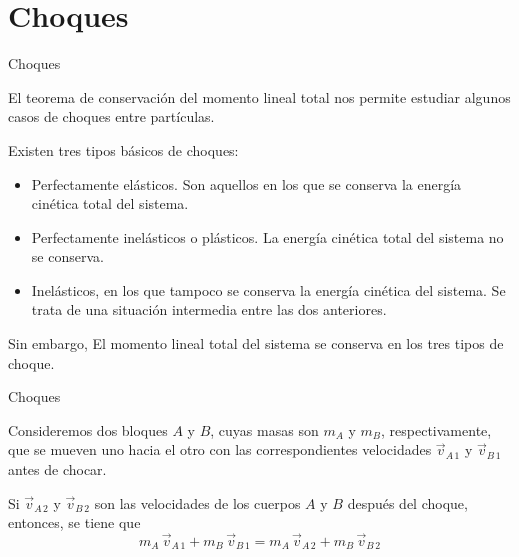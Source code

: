 \documentclass[11pt,handout,aspectratio=1610]{beamer}
\begin{document}
\section{Choques}

\begin{frame}{Choques}

    El teorema de conservación del momento lineal total nos permite estudiar algunos casos de choques entre partículas. \pause

    \vspace{0.3cm}

    Existen tres tipos básicos de choques: \pause
    \begin{itemize}
        \item Perfectamente elásticos. \pause Son aquellos en los que se conserva la energía cinética total del sistema. \pause
        \item Perfectamente inelásticos o plásticos. \pause La energía cinética total del sistema no se conserva.
        \item Inelásticos, en los que tampoco se conserva la energía cinética del sistema. Se trata de una situación intermedia entre las dos anteriores.
    \end{itemize} \pause

    \begin{alertblock}{Sin embargo,}
        El momento lineal total del sistema se conserva en los tres tipos de choque.
    \end{alertblock}

\end{frame}

\begin{frame}{Choques}

    Consideremos dos bloques $A$ y $B$, cuyas masas son $m_A$ y $m_B$, respectivamente, que se mueven uno hacia el otro con las correspondientes velocidades $\vec{v}_{A \, 1}$ y $\vec{v}_{B\,1}$ antes de chocar.

    \begin{figure}
        \centering
    \end{figure}

    Si $\vec{v}_{A \, 2}$ y $\vec{v}_{B\,2}$ son las velocidades de los cuerpos $A$ y $B$ después del choque, entonces, se tiene que $$m_A \, \vec{v}_{A \, 1} + m_B \, \vec{v}_{B\,1} = m_A \, \vec{v}_{A \, 2} + m_B \, \vec{v}_{B\,2}$$

\end{frame}
\end{document}
